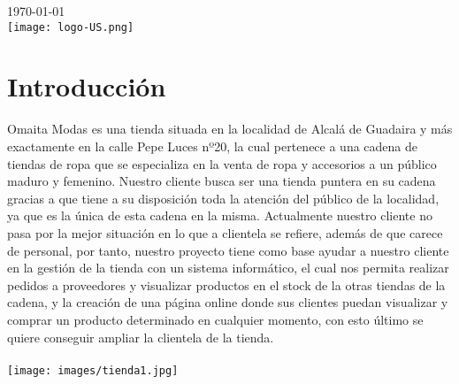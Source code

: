 \begin{titlepage}

\vspace{1cm}
{\large \today}\\[1cm] %


\texttt{[image: logo-US.png]} %
 

\vfill %

\end{titlepage}

\tableofcontents
\newpage

\section{Introducción}

Omaita Modas es una tienda situada en la localidad de Alcalá de Guadaira y más exactamente en la calle Pepe Luces nº20, la cual pertenece a una cadena de tiendas de ropa que se especializa en la venta de ropa y accesorios a un público maduro y femenino.
Nuestro cliente busca ser una tienda puntera en su cadena gracias a que tiene a su disposición toda la atención del público de la localidad, ya que es la única de esta cadena en la misma. Actualmente nuestro cliente no pasa por la mejor situación en lo que a clientela se refiere, además de que carece de personal, por tanto, nuestro proyecto tiene como base ayudar a nuestro cliente en la gestión de la tienda con un sistema informático, el cual nos permita realizar pedidos a proveedores y visualizar productos en el stock de la otras tiendas de la cadena,  y la creación de una página online donde sus clientes puedan visualizar y comprar un producto determinado en cualquier momento, con esto último se quiere conseguir ampliar la clientela de la tienda.
\\\\
\texttt{[image: images/tienda1.jpg]}

